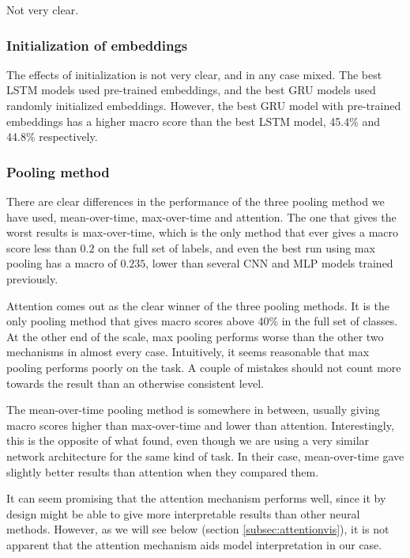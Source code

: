 Not very clear.


\subsubsection*{Initialization of embeddings}

The effects of initialization is not very clear, and in any case mixed.
The best LSTM models used pre-trained embeddings, and the best GRU models
used randomly initialized embeddings. However, the best GRU model with
pre-trained embeddings has a higher macro \FI score than the best LSTM model,
45.4\% and 44.8\% respectively.


\subsubsection*{Pooling method}

There are clear differences in the performance of the three pooling method we
have used, mean-over-time, max-over-time and attention. The one that gives
the worst results is max-over-time, which is the only method that ever gives
a macro \FI score less than $0.2$ on the full set of labels, and even the
best run using max pooling has a macro \FI of $0.235$, lower than several CNN
and MLP models trained previously.

Attention comes out as the clear winner of the three pooling methods. It is
the only pooling method that gives macro \FI scores above 40\% in the full
set of classes. At the other end of the scale, max pooling performs worse
than the other two mechanisms in almost every case. Intuitively, it seems
reasonable that max pooling performs poorly on the task. A couple of mistakes
should not count more towards the result than an otherwise consistent level.

The mean-over-time pooling method is somewhere in between, usually giving
macro \FI scores higher than max-over-time and lower than attention.
Interestingly, this is the opposite of what \textcite{taghipour16} found,
even though we are using a very similar network architecture for the same
kind of task. In their case, mean-over-time gave slightly better results than
attention when they compared them.

It can seem promising that the attention mechanism performs well, since it by
design might be able to give more interpretable results than other neural
methods. However, as we will see below (section \ref{subsec:attentionvis}),
it is not apparent that the attention mechanism aids model interpretation in
our case.


